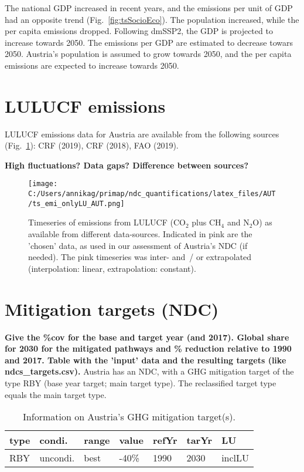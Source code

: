 \documentclass[12pt]{article}
\begin{document}
 The national GDP increased in recent years, and the emissions per unit of GDP had an opposite trend (Fig.~\ref{fig:tsSocioEco}).
 The population increased, while the per capita emissions dropped. 
 Following dmSSP2, the GDP is projected to increase towards 2050. 
 The emissions per GDP are estimated to decrease towars 2050. 
 Austria's population is assumed to grow towards 2050, and the per capita emissions are expected to increase towards 2050. 

 \section{LULUCF emissions}
 \label{sec:emiLULUCF}
 LULUCF emissions data for Austria are available from the following sources (Fig.~\ref{fig:tsLULUCF}): CRF (2019), CRF (2018), FAO (2019).

 \textbf{High fluctuations? Data gaps? Difference between sources?}

 \begin{figure}[H]
 \centering
 \texttt{[image: C:/Users/annikag/primap/ndc\_quantifications/latex\_files/AUT/ts\_emi\_onlyLU\_AUT.png]}
 \caption{Timeseries of emissions from LULUCF (CO$_2$ plus CH$_4$ and N$_2$O) as available from different data-sources. 
 Indicated in pink are the 'chosen' data, as used in our assessment of Austria's NDC (if needed). 
 The pink timeseries was inter- and~/ or extrapolated (interpolation: linear, extrapolation: constant).}
 \label{fig:tsLULUCF}
 \end{figure}

 \section{Mitigation targets (NDC)}
 \label{sec:mitiTars}

 \textbf{ 
 Give the \%cov for the base and target year (and 2017).
 Global share for 2030 for the mitigated pathways and \% reduction relative to 1990 and 2017.
 Table with the 'input' data and the resulting targets (like ndcs\_targets.csv).}
 Austria has an NDC, with a GHG mitigation target of the type RBY (base year target; main target type).
 The reclassified target type equals the main target type.

 \begin{table}[H]
 \centering
 \caption{Information on Austria's GHG mitigation target(s).}
 \label{tab:mitiTars}
 \begin{tabular}{l l l l l l l }
 \bfseries type & \bfseries condi. & \bfseries range & \bfseries value & \bfseries refYr & \bfseries tarYr & \bfseries LU \tabularnewline \hline
 RBY & uncondi. & best & -40\% & 1990 & 2030 & inclLU \tabularnewline 
 \end{tabular}
 \end{table}
\end{document}
